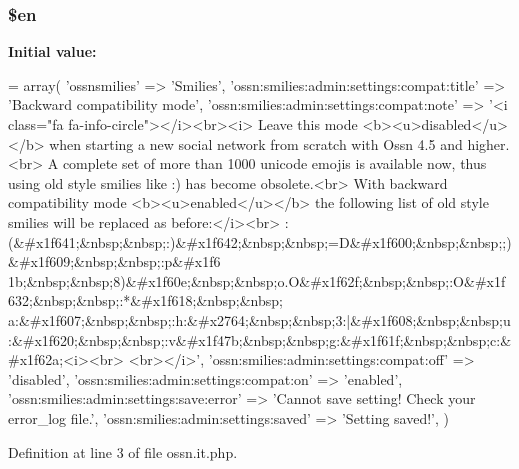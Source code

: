 \subsubsection[{\texorpdfstring{\$en}{$en}}]{\setlength{\rightskip}{0pt plus 5cm}\$en}\hypertarget{components_2_ossn_smilies_2locale_2ossn_8it_8php_a48abc714dfb71c8fffa83cf49f452115}{}\label{components_2_ossn_smilies_2locale_2ossn_8it_8php_a48abc714dfb71c8fffa83cf49f452115}
{\bfseries Initial value\+:}
\begin{DoxyCode}
= array(
        \textcolor{stringliteral}{'ossnsmilies'} => \textcolor{stringliteral}{'Smilies'},
        \textcolor{stringliteral}{'ossn:smilies:admin:settings:compat:title'} => \textcolor{stringliteral}{'Backward compatibility mode'},
        \textcolor{stringliteral}{'ossn:smilies:admin:settings:compat:note'} => \textcolor{stringliteral}{'<i class="fa fa-info-circle"></i><br><i>}
\textcolor{stringliteral}{        Leave this mode <b><u>disabled</u></b> when starting a new social network from scratch with Ossn
       4.5 and higher.<br>}
\textcolor{stringliteral}{        A complete set of more than 1000 unicode emojis is available now, thus using old style smilies like
       :) has become obsolete.<br>}
\textcolor{stringliteral}{        With backward compatibility mode <b><u>enabled</u></b> the following list of old style smilies will
       be replaced as before:</i><br>}
\textcolor{stringliteral}{        
      :(&#x1f641;&nbsp;&nbsp;:)&#x1f642;&nbsp;&nbsp;=D&#x1f600;&nbsp;&nbsp;;)&#x1f609;&nbsp;&nbsp;:p&#x1f6
      1b;&nbsp;&nbsp;8)&#x1f60e;&nbsp;&nbsp;o.O&#x1f62f;&nbsp;&nbsp;:O&#x1f632;&nbsp;&nbsp;:*&#x1f618;&nbsp;&nbsp;
      a:&#x1f607;&nbsp;&nbsp;:h:&#x2764;&nbsp;&nbsp;3:|&#x1f608;&nbsp;&nbsp;u:&#x1f620;&nbsp;&nbsp;:v&#x1f47b;&nbsp;&nbsp;g:&#x1f61f;&nbsp;&nbsp;c:&#x1f62a;<i><br>}
\textcolor{stringliteral}{        <br></i>'},
        \textcolor{stringliteral}{'ossn:smilies:admin:settings:compat:off'} => \textcolor{stringliteral}{'disabled'},
        \textcolor{stringliteral}{'ossn:smilies:admin:settings:compat:on'} => \textcolor{stringliteral}{'enabled'},
        \textcolor{stringliteral}{'ossn:smilies:admin:settings:save:error'} => \textcolor{stringliteral}{'Cannot save setting! Check your error\_log file.'},
        \textcolor{stringliteral}{'ossn:smilies:admin:settings:saved'} => \textcolor{stringliteral}{'Setting saved!'},
)
\end{DoxyCode}


Definition at line 3 of file ossn.\+it.\+php.

